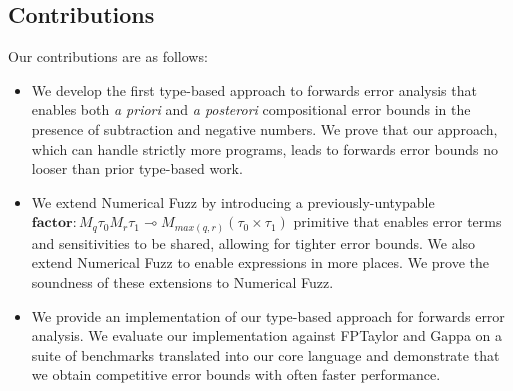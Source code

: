 
\subsection{Contributions}

Our contributions are as follows:
\begin{itemize}
  \item We develop the first type-based approach to forwards error analysis that
    enables both \textit{a priori} and \textit{a posterori} compositional error
    bounds in the presence of subtraction and negative numbers. We prove that
    our approach, which can handle strictly more programs, leads to forwards
    error bounds no looser than prior type-based work.

  \item We extend Numerical Fuzz by introducing a
    previously-untypable 
    $\textbf{factor} : M_q \tau_0 M_r \tau_1 \multimap M_{max(q, r)} (\tau_0
    \times \tau_1)$
    primitive that enables error terms and sensitivities to be shared, allowing
    for tighter error bounds. We also extend Numerical Fuzz to enable
    expressions in more places. We prove the soundness of these extensions to
    Numerical Fuzz.

  \item We provide an implementation of our type-based approach for forwards
    error analysis. We evaluate our implementation against FPTaylor and Gappa on
    a suite of benchmarks translated into our core language and demonstrate that
    we obtain competitive error bounds with often faster performance.
\end{itemize}
